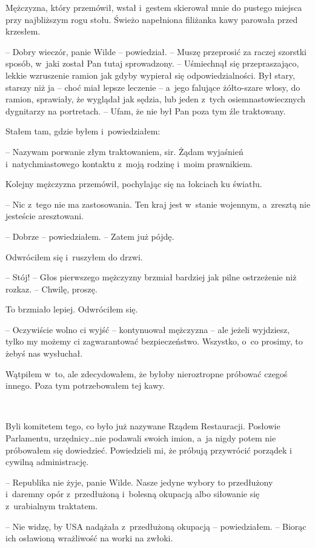 \documentclass[oneside,polish,11pt,sfheadings]{mwbk}
\begin{document}
Mężczyzna, który przemówił, wstał i~gestem skierował mnie do pustego
miejsca przy najbliższym rogu stołu. Świeżo napełniona filiżanka kawy
parowała przed krzesłem.

-- Dobry wieczór, panie Wilde -- powiedział. -- Muszę przeprosić za raczej
szorstki sposób, w~jaki został Pan tutaj sprowadzony. -- Uśmiechnął się
przepraszająco, lekkie wzruszenie ramion jak gdyby wypierał się
odpowiedzialności. Był stary, starszy niż ja -- choć miał lepsze leczenie
-- a~jego falujące żółto-szare włosy, do ramion, sprawiały, że wyglądał
jak sędzia, lub jeden z~tych osiemnastowiecznych dygnitarzy na
portretach. -- Ufam, że nie był Pan poza tym źle traktowany.

Stałem tam, gdzie byłem i~powiedziałem: 

-- Nazywam porwanie złym traktowaniem, sir. Żądam wyjaśnień i~natychmiastowego kontaktu z~moją
rodzinę i~moim prawnikiem.

Kolejny mężczyzna przemówił, pochylając się na łokciach ku światłu. 

-- Nic z~tego nie ma zastosowania. Ten kraj jest w~stanie wojennym, a~zresztą nie jesteście aresztowani.

-- Dobrze -- powiedziałem. -- Zatem już pójdę.

Odwróciłem się i~ruszyłem do drzwi.

-- Stój! -- Głos pierwszego mężczyzny brzmiał bardziej jak pilne
ostrzeżenie niż rozkaz. -- Chwilę, proszę.

To brzmiało lepiej. Odwróciłem się.

-- Oczywiście wolno ci wyjść -- kontynuował mężczyzna -- ale jeżeli
wyjdziesz, tylko my możemy ci zagwarantować bezpieczeństwo. Wszystko, o~co prosimy, to żebyś nas wysłuchał.

Wątpiłem w~to, ale zdecydowałem, że byłoby nieroztropne próbować czegoś
innego. Poza tym potrzebowałem tej kawy.

~

Byli komitetem tego, co było już nazywane Rządem Restauracji. Posłowie
Parlamentu, urzędnicy\ldots nie podawali swoich imion, a~ja nigdy potem nie
próbowałem się dowiedzieć. Powiedzieli mi, że próbują przywrócić porządek
i cywilną administrację.

-- Republika nie żyje, panie Wilde. Nasze jedyne wybory to przedłużony i~daremny opór z~przedłużoną i~bolesną okupacją albo siłowanie się z~urabialnym traktatem.

-- Nie widzę, by USA nadążała z~przedłużoną okupacją -- powiedziałem. -- Biorąc ich osławioną wrażliwość na worki na zwłoki.
\end{document}
